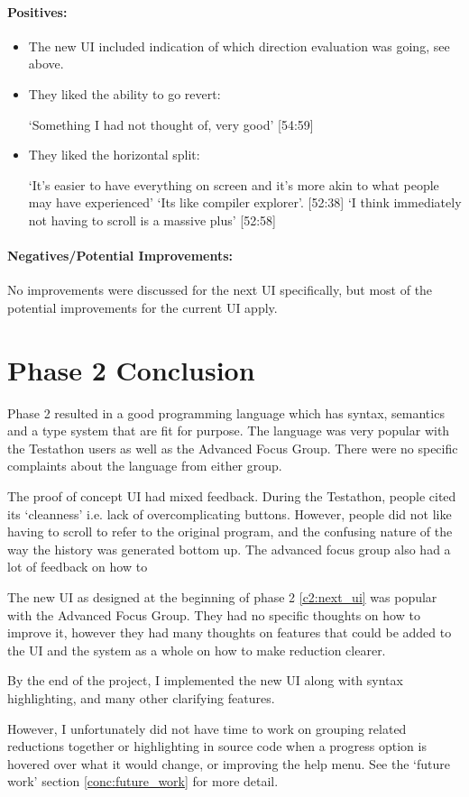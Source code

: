 \paragraph{Positives:}
\begin{itemize}
    \item The new UI included indication of which direction evaluation was going, see above. 
    \item They liked the ability to go revert: 
    
    `Something I had not thought of, very good' [54:59]
    \item They liked the horizontal split: 
    
    `It's easier to have everything on screen and it's more akin to what people may have experienced' `Its like compiler explorer'. [52:38] `I think immediately not having to scroll is a massive plus' [52:58]
\end{itemize}

\paragraph{Negatives/Potential Improvements:}
No improvements were discussed for the next UI specifically, but most of the potential improvements for the current UI apply. 

\section{Phase 2 Conclusion}
Phase 2 resulted in a good programming language which has syntax, semantics and a type system that are fit for purpose. The language was very popular with the Testathon users as well as the Advanced Focus Group. There were no specific complaints about the language from either group. 

The proof of concept UI had mixed feedback. During the Testathon, people cited its `cleanness' i.e. lack of overcomplicating buttons. However, people did not like having to scroll to refer to the original program, and the confusing nature of the way the history was generated bottom up. The advanced focus group also had a lot of feedback on how to

The new UI as designed at the beginning of phase 2 \ref{c2:next_ui} was popular with the Advanced Focus Group. They had no specific thoughts on how to improve it, however they had many thoughts on features that could be added to the UI and the system as a whole on how to make reduction clearer. 

By the end of the project, I implemented the new UI along with syntax highlighting, and many other clarifying features. 

However, I unfortunately did not have time to work on grouping related reductions together or highlighting in source code when a progress option is hovered over what it would change, or improving the help menu. See the `future work' section \ref{conc:future_work} for more detail. 